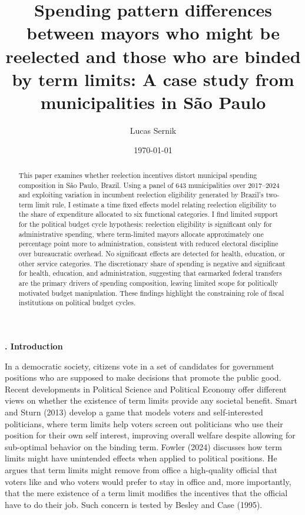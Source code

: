 \documentclass[12pt, a4paper]{article}
\author{Lucas Sernik}
\title{Spending pattern differences between mayors who might be reelected and those who are binded by term limits: A case study from municipalities in São Paulo}
\date{\today}
\newcounter{headercounter}
\newcommand{\header}[1]{\begin{center}{\large \textbf{\Roman{headercounter}. #1}} \end{center} \stepcounter{headercounter}}
\begin{document}
\maketitle

\begin{abstract}
This paper examines whether reelection incentives distort municipal spending composition in São Paulo, Brazil. Using a panel of 643 municipalities over 2017--2024 and exploiting variation in incumbent reelection eligibility generated by Brazil's two-term limit rule, I estimate a time fixed effects model relating reelection eligibility to the share of expenditure allocated to six functional categories. I find limited support for the political budget cycle hypothesis: reelection eligibility is significant only for administrative spending, where term-limited mayors allocate approximately one percentage point more to administration, consistent with reduced electoral discipline over bureaucratic overhead. No significant effects are detected for health, education, or other service categories. The discretionary share of spending is negative and significant for health, education, and administration, suggesting that earmarked federal transfers are the primary drivers of spending composition, leaving limited scope for politically motivated budget manipulation. These findings highlight the constraining role of fiscal institutions on political budget cycles.
\end{abstract}

\newpage

\header{Introduction}

In a democratic society, citizens vote in a set of candidates for government positions who are supposed to make decisions that promote the public good. Recent developments in Political Science and Political Economy offer different views on whether the existence of term limits provide any societal benefit. Smart and Sturn (2013) develop a game that models voters and self-interested politicians, where term limits help voters screen out politicians who use their position for their own self interest, improving overall welfare despite allowing for sub-optimal behavior on the binding term. Fowler (2024) discusses how term limits might have unintended effects when applied to political positions. He argues that term limits might remove from office a high-quality official that voters like and who voters would prefer to stay in office and, more importantly, that the mere existence of a term limit modifies the incentives that the official have to do their job. Such concern is tested by Besley and Case (1995). 
\end{document}
